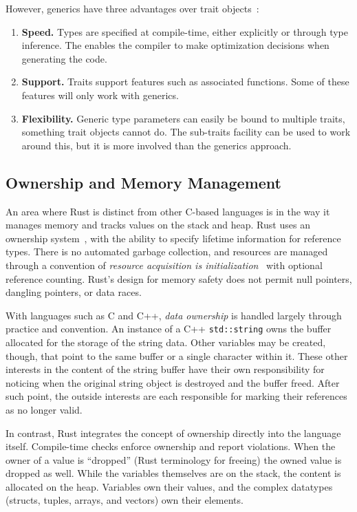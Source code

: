 However, generics have three advantages over trait objects~\cite[Chapter~11]{programming.rust.2021}:

\begin{enumerate}
\item \textbf{Speed.} Types are specified at compile-time, either explicitly or through type inference. The enables the compiler to make optimization decisions when generating the code.
\item \textbf{Support.} Traits support features such as associated functions. Some of these features will only work with generics.
\item \textbf{Flexibility.} Generic type parameters can easily be bound to multiple traits, something trait objects cannot do. The sub-traits facility can be used to work around this, but it is more involved than the generics approach.
\end{enumerate}

\subsection{Ownership and Memory Management}

An area where Rust is distinct from other C-based languages is in the way it manages memory and tracks values on the stack and heap. Rust uses an ownership system~\cite[Chapter~4]{programming.rust.2021}, with the ability to specify lifetime information for reference types. There is no automated garbage collection, and resources are managed through a convention of \textit{resource acquisition is initialization}~\cite{cpp.design.evolution.1994} with optional reference counting. Rust's design for memory safety does not permit null pointers, dangling pointers, or data races.

With languages such as C and C++, \textit{data ownership} is handled largely through practice and convention. An instance of a C++ \texttt{std::string} owns the buffer allocated for the storage of the string data. Other variables may be created, though, that point to the same buffer or a single character within it. These other interests in the content of the string buffer have their own responsibility for noticing when the original string object is destroyed and the buffer freed. After such point, the outside interests are each responsible for marking their references as no longer valid.

In contrast, Rust integrates the concept of ownership directly into the language itself. Compile-time checks enforce ownership and report violations. When the owner of a value is ``dropped'' (Rust terminology for freeing) the owned value is dropped as well. While the variables themselves are on the stack, the content is allocated on the heap. Variables own their values, and the complex datatypes (structs, tuples, arrays, and vectors) own their elements.

